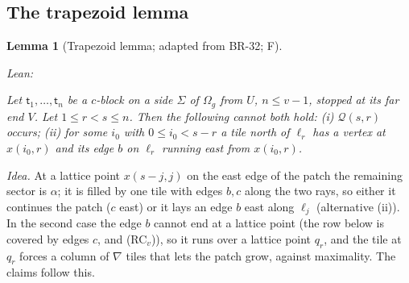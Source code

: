 \documentclass[11pt,reqno]{amsart}
\theoremstyle{plain}
\newtheorem{lemma}[theorem]{Lemma}
\theoremstyle{definition}
\newcommand{\sF}{\textup{\textsf{F}}}
\begin{document}
\subsection{The trapezoid lemma}\label{sub:trap}
\begin{lemma}[Trapezoid lemma; adapted from BR-32; \sF]\label{lem:trap}
{\small\noindent\emph{Lean:} \par}
Let $\mathsf t_1,\dots,\mathsf t_n$ be a $c$-block on a side $\Sigma$ of $\Omega_{g}$ from $U$, $n\le v-1$, stopped at its far end $V$. Let $1\le r<s\le n$. Then the following cannot both hold: \textup{(i)} $\mathcal Q(s,r)$ occurs; \textup{(ii)} for some $i_0$ with $0\le i_0<s-r$ a tile north of $\ell_r$ has a vertex at $x(i_0,r)$ and its edge $b$ on $\ell_r$ running east from $x(i_0,r)$.
\end{lemma}
\emph{Idea.} At a lattice point $x(s-j,j)$ on the east edge of the patch the remaining sector is $\alpha$; it is filled by one tile with edges $b,c$ along the two rays, so either it continues the patch ($c$ east) or it lays an edge $b$ east along $\ell_j$ (alternative (ii)). In the second case the edge $b$ cannot end at a lattice point (the row below is covered by edges $c$, and (RC$_v$)), so it runs over a lattice point $q_r$, and the tile at $q_r$ forces a column of $\nabla$ tiles that lets the patch grow, against maximality. The claims follow this.
\end{document}
